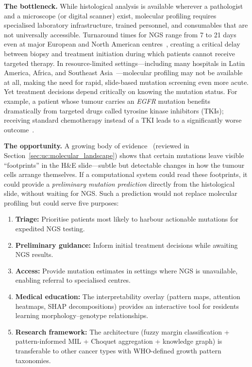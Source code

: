 \textbf{The bottleneck.}
While histological analysis is available wherever a pathologist and a microscope (or digital scanner) exist, molecular profiling requires specialised laboratory infrastructure, trained personnel, and consumables that are not universally accessible.
Turnaround times for NGS range from 7 to 21 days even at major European and North American centres~\cite{vanderlaan2018molecular}, creating a critical delay between biopsy and treatment initiation during which patients cannot receive targeted therapy.
In resource-limited settings---including many hospitals in Latin America, Africa, and Southeast Asia~\cite{sung2021global}---molecular profiling may not be available at all, making the need for rapid, slide-based mutation screening even more acute.
Yet treatment decisions depend critically on knowing the mutation status.
For example, a patient whose tumour carries an \textit{EGFR} mutation benefits dramatically from targeted drugs called tyrosine kinase inhibitors (TKIs); receiving standard chemotherapy instead of a TKI leads to a significantly worse outcome~\cite{soria2018flaura}.

\textbf{The opportunity.}
A growing body of evidence~\cite{coudray2018classification,kather2020pancancer} (reviewed in Section~\ref{sec:uc:molecular_landscape}) shows that certain mutations leave visible ``footprints'' in the H\&E slide---subtle but detectable changes in how the tumour cells arrange themselves.
If a computational system could read these footprints, it could provide a \emph{preliminary mutation prediction} directly from the histological slide, without waiting for NGS.
Such a prediction would not replace molecular profiling but could serve five purposes:
\begin{enumerate}
    \item \textbf{Triage:} Prioritise patients most likely to harbour actionable mutations for expedited NGS testing.
    \item \textbf{Preliminary guidance:} Inform initial treatment decisions while awaiting NGS results.
    \item \textbf{Access:} Provide mutation estimates in settings where NGS is unavailable, enabling referral to specialised centres.
    \item \textbf{Medical education:} The interpretability overlay (pattern maps, attention heatmaps, SHAP decompositions) provides an interactive tool for residents learning morphology--genotype relationships.
    \item \textbf{Research framework:} The architecture (fuzzy margin classification + pattern-informed MIL + Choquet aggregation + knowledge graph) is transferable to other cancer types with WHO-defined growth pattern taxonomies.
\end{enumerate}

